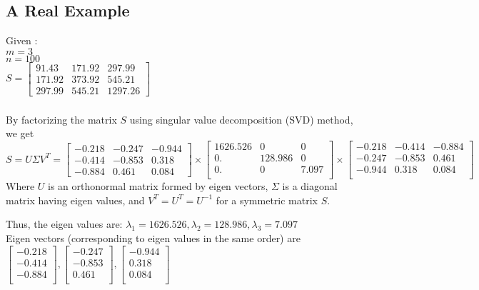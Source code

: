 \documentclass[a4paper,doc,notimes]{article}
\begin{document}
\subsection{A Real Example}
Given : \\
$ m = 3 $ \\
$ n = 100 $ \\
$ S =  \begin{bmatrix}
91.43    & 171.92 & 297.99 \\
171.92   & 373.92 & 545.21 \\
297.99   & 545.21 & 1297.26
\end{bmatrix} $

\subsubsection{}
By factorizing the matrix $S$ using singular value decomposition (SVD) method, we get \\
$
S = U \Sigma V^T = 
 \begin{bmatrix}
	-0.218 & -0.247 & -0.944 \\
	-0.414 & -0.853 & 0.318 \\
	-0.884 & 0.461 & 0.084
\end{bmatrix} 
\times 
 \begin{bmatrix}
	1626.526  & 0          &  0 \\
	0.            & 128.986 &   0 \\
	0.            &  0           &  7.097 \\
\end{bmatrix} 
\times 
\begin{bmatrix}
	-0.218 & -0.414 & -0.884 \\
	-0.247 & -0.853 & 0.461 \\
	-0.944 & 0.318  & 0.084 \\
\end{bmatrix} $ \\
Where $U$ is an orthonormal matrix formed by eigen vectors, $\Sigma$ is a diagonal matrix having eigen values, and $V^T = U^T = U^{-1}$ for a symmetric matrix $S$.

Thus, the eigen values are: $\lambda_1=1626.526, \lambda_2=128.986, \lambda_3=7.097 $ \\
Eigen vectors (corresponding to eigen values in the same order) are \\
$
	\begin{bmatrix} -0.218 \\	-0.414 \\ 	-0.884 \\ \end{bmatrix} , 
	\begin{bmatrix} -0.247  \\	-0.853 \\ 	0.461 \\ \end{bmatrix} , 
	\begin{bmatrix} -0.944  \\	0.318  \\ 	0.084 \\ \end{bmatrix} 
$
\end{document}
